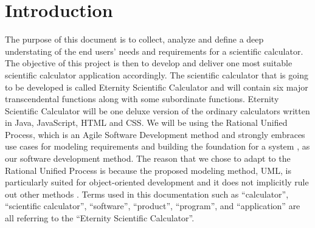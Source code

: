 \documentclass[12pt]{article}
\begin{document}
\section{Introduction}
The purpose of this document is to collect, analyze and define a deep understating of the end
users’ needs and requirements for a scientific calculator. The objective of this project is then
to develop and deliver one most suitable scientific calculator application accordingly.\newline\newline
The scientific calculator that is going to be developed is called Eternity Scientific Calculator and will contain six major transcendental functions along with some subordinate functions.\newline\newline
Eternity Scientific Calculator will be one deluxe version of the ordinary calculators written in Java, JavaScript, HTML and CSS.\newline\newline
We will be using the Rational Unified Process, which is an Agile Software Development method and strongly embraces use cases for modeling requirements and building the foundation for a system \cite{abrahamsson2017agile}, as our software development method.\newline\newline
The reason that we chose to adapt to the Rational Unified Process is because the proposed modeling method, UML, is particularly suited for object-oriented development and it does not implicitly rule out other methods \cite{jacobson1993object}.\newline\newline
Terms used in this documentation such as “calculator”, “scientific calculator”, “software”, “product”, “program”, and “application” are all referring to the “Eternity Scientific Calculator”.
\newpage
\end{document}
